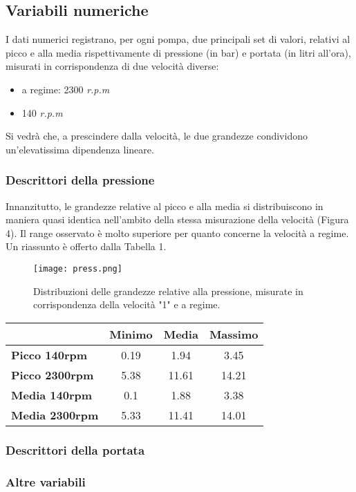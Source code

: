 \documentclass[fleqn,10pt]{SelfArx} %
\begin{document}
\subsection{Variabili numeriche}
I dati numerici registrano, per ogni pompa, due principali set di valori, relativi al picco e alla media rispettivamente di pressione (in bar) e portata (in litri all'ora), misurati in corrispondenza di due velocità diverse:
\begin{itemize}
    \item a regime: 2300 \textit{r.p.m}
    \item 140 \textit{r.p.m}
\end{itemize}
Si vedrà che, a prescindere dalla velocità, le due grandezze condividono un'elevatissima dipendenza lineare.
\subsubsection{Descrittori della pressione}
Innanzitutto, le grandezze relative al picco e alla media si distribuiscono in maniera quasi identica nell'ambito della stessa misurazione della velocità (Figura 4). Il range osservato è molto superiore per quanto concerne la velocità a regime. Un riassunto è offerto dalla Tabella 1.
\begin{figure}[ht]
    \centering
    \texttt{[image: press.png]}
    \label{fig:em}
    \caption{Distribuzioni delle grandezze relative alla pressione, misurate in corrispondenza della velocità "1" e a regime.}
\end{figure}
{\begin{table}[ht]
\centering
\begin{tabular}[t]{lccc}
\toprule
&Minimo&Media&Massimo\\
\midrule
\textbf{Picco 140rpm}&0.19&1.94&3.45\\
\textbf{Picco 2300rpm}&5.38&11.61&14.21\\
\textbf{Media 140rpm}&0.1&1.88&3.38\\
\textbf{Media 2300rpm}&5.33&11.41&14.01\\
\bottomrule
\end{tabular}
\end{table}}
\subsubsection{Descrittori della portata}
\subsubsection{Altre variabili}
\end{document}

